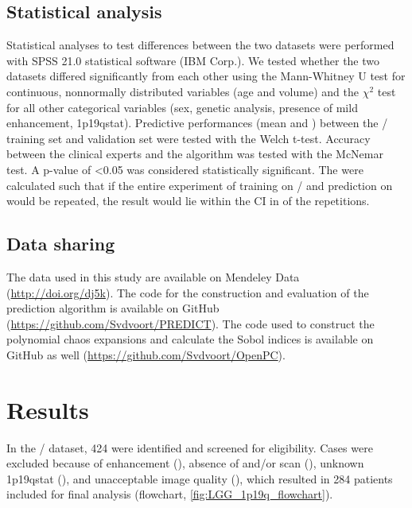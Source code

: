 \subsection{Statistical analysis}

Statistical analyses to test differences between the two datasets were performed with SPSS \num{21.0} statistical software (IBM Corp.).
We tested whether the two datasets differed significantly from each other using the Mann-Whitney U test for continuous, nonnormally distributed variables (age and volume) and the $\chi^2$ test for all other categorical variables (sex, genetic analysis, presence of mild enhancement, \acl{1p19qstat}).
Predictive performances (mean and  ) between the / training set and  validation set were tested with the Welch t-test.
Accuracy between the clinical experts and the algorithm was tested with the McNemar test.
A p-value of \num{<0.05} was considered statistically significant.
The   were calculated such that if the entire experiment of training on / and prediction on  would be repeated, the result would lie within the \gls{CI} in  of the repetitions.

\subsection{Data sharing}

The data used in this study are available on Mendeley Data (\url{http://doi.org/dj5k}).
The code for the construction and evaluation of the prediction algorithm is available on GitHub (\url{https://github.com/Svdvoort/PREDICT}).
The code used to construct the polynomial chaos expansions and calculate the Sobol indices is available on GitHub as well (\url{https://github.com/Svdvoort/OpenPC}).


\section{Results}

In the / dataset, 424  were identified and screened for eligibility.
Cases were excluded because of enhancement (), absence of  and/or   scan (), unknown \acl{1p19qstat} (), and unacceptable image quality (), which resulted in 284 patients included for final analysis (flowchart, \cref{fig:LGG_1p19q_flowchart}).


